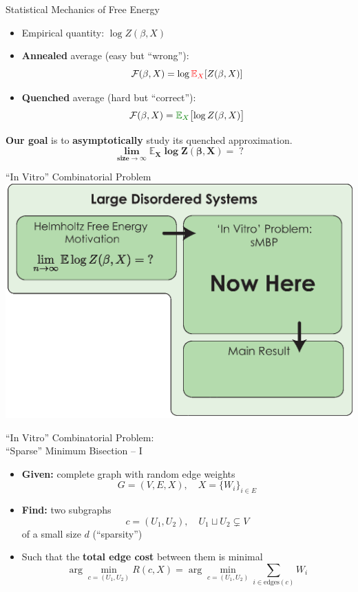\documentclass[presentation,12pt]{beamer}
\newcommand{\setroadmapfootline}{%
\setfootline{%
  \textcolor{gray!60}{%
    \tiny\insertshortdate \hfill \insertshortauthor \quad 
    \phantom{\insertframenumber/\inserttotalframenumber}
  }%
}%
}
\newcommand{\Expct}{\mathbb{E}}
\begin{document}
\begin{frame}{Statistical Mechanics of Free Energy}

  \begin{itemize}
    \item Empirical quantity:  $\log Z(\beta, X)$
    \item \textbf{Annealed} average (easy but ``wrong''):  \\
      \[ \mathcal{F}(\beta, X) = \log {\color{red} \Expct_X} [Z(\beta, X)]  \]
    \item \textbf{Quenched} average (hard but ``correct''):   \\
     \[ \mathcal{F}(\beta, X) = {\color{green!50!black} \Expct_X} \bigl[\log Z(\beta, X)\bigr] \]
  \end{itemize}

  \bigskip
  \textbf{Our goal} is to \textbf{asymptotically} study its quenched
      approximation. 
      \[
        \boldsymbol{\lim_{\text{size} \to \infty} \Expct_X \log Z(\beta, X) = \; ?}
      \]
\end{frame}

{\setroadmapfootline \begin{frame}[noframenumbering]{``In Vitro'' Combinatorial Problem}
\centering
\includegraphics[width=\textwidth]{roadmap_after_free_energy} 
\end{frame}}

\begin{frame}{``In Vitro'' Combinatorial Problem: \\ ``Sparse'' Minimum Bisection -- I}
\begin{itemize}
  \item<+-> \textbf{Given:} complete graph with random edge weights
    \[G = (V, E, X), \quad X = \{W_i\}_{i \in E}\]
  \item<+-> \textbf{Find:} two subgraphs 
    \[c = (U_1, U_2), \quad U_1 \sqcup U_2 \subsetneq V \]
  of a small size $d$ (``sparsity'')  
  \item<+-> Such that the \textbf{total edge cost} between them is minimal
    \[ \arg \min_{c = (U_1, U_2)} R(c, X) = \arg \min_{c = (U_1, U_2)} \sum_{i \in \mathrm{edges}(c)} W_i \]
\end{itemize}
\end{frame}
\end{document}
